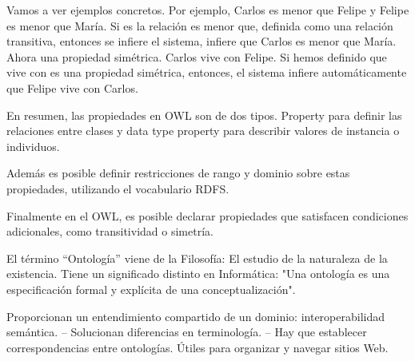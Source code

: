 Vamos a ver ejemplos concretos. Por ejemplo, Carlos es menor que Felipe y Felipe es menor que María. Si es la relación es menor que, definida como una relación transitiva, entonces se infiere el sistema, infiere que Carlos es menor que María. Ahora una propiedad simétrica. Carlos vive con Felipe. Si hemos definido que vive con es una propiedad simétrica, entonces, el sistema infiere automáticamente que Felipe vive con Carlos.

En resumen, las propiedades en OWL son de dos tipos. Property para definir las relaciones entre clases y data type property para describir valores de instancia o individuos.

Además es posible definir restricciones de rango y dominio sobre estas propiedades, utilizando el vocabulario RDFS.

Finalmente en el OWL, es posible declarar propiedades que satisfacen condiciones adicionales, como transitividad o simetría.


El término “Ontología” viene de la Filosofía: El estudio de la naturaleza de la existencia. Tiene un significado distinto en Informática: "Una ontología es una especificación formal y explícita de una conceptualización". 

Proporcionan un entendimiento compartido de un dominio: interoperabilidad semántica.
– Solucionan diferencias en terminología.
– Hay que establecer correspondencias entre ontologías.
Útiles para organizar y navegar sitios Web.


